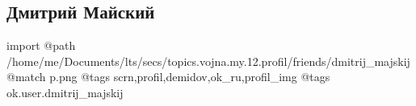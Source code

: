  
 
 
 
 

\subsection{Дмитрий Майский}

\ifcmt
 import
 @path /home/me/Documents/lts/secs/topics.vojna.my.12.profil/friends/dmitrij_majskij
 @match p.png
 @tags scrn,profil,demidov,ok_ru,profil_img
 @tags ok.user.dmitrij_majskij
\fi

